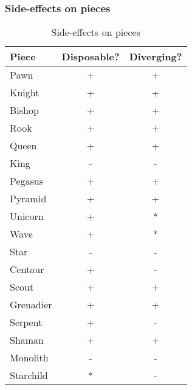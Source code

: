 \subsubsection*{Side-effects on pieces}
\label{sec:Appendix/Summary/Side-effects/Side-effects on pieces}

\begin{table}[!h]
\centering
\begin{tabular}{ lcc }
\toprule %
\textbf{Piece} & \textbf{Disposable?} & \textbf{Diverging?}   \\
\midrule %
Pawn           & +                    & +                     \\
Knight         & +                    & +                     \\
Bishop         & +                    & +                     \\
Rook           & +                    & +                     \\
Queen          & +                    & +                     \\
King           & -                    & -                     \\
\cmidrule{1-3} %
Pegasus        & +                    & +                     \\
Pyramid        & +                    & +                     \\
Unicorn        & +                    & *\footnotemark[2]     \\
Wave           & +                    & *\footnotemark[3]     \\
Star           & -                    & -                     \\
Centaur        & +                    & -                     \\
Scout          & +                    & +                     \\
Grenadier      & +                    & +                     \\
Serpent        & +                    & -                     \\
Shaman         & +                    & +                     \\
Monolith       & -                    & -                     \\
Starchild      & *\footnotemark[1]    & -                     \\
\bottomrule %
\end{tabular}
\caption{Side-effects on pieces}
\label{tbl:Appendix/Summary/Side-effects/Side-effects on pieces}
\end{table}

